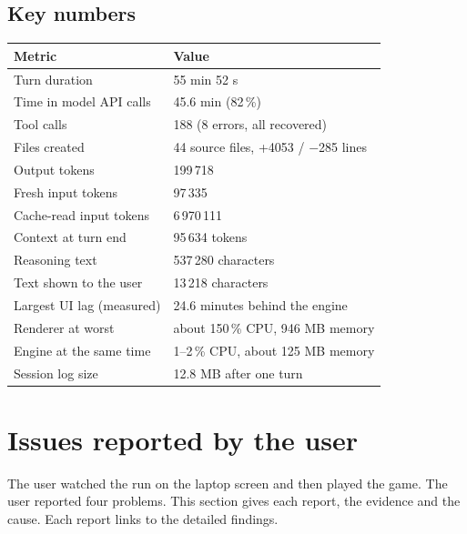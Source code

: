 \documentclass[11pt,a4paper]{article}
\begin{document}
\subsection{Key numbers}
\begin{center}
\begin{tabular}{@{}ll@{}}
\toprule
Metric & Value \\
\midrule
Turn duration & 55 min 52 s \\
Time in model API calls & 45.6 min (82\,\%) \\
Tool calls & 188 (8 errors, all recovered) \\
Files created & 44 source files, +4053 / $-$285 lines \\
Output tokens & 199\,718 \\
Fresh input tokens & 97\,335 \\
Cache-read input tokens & 6\,970\,111 \\
Context at turn end & 95\,634 tokens \\
Reasoning text & 537\,280 characters \\
Text shown to the user & 13\,218 characters \\
Largest UI lag (measured) & 24.6 minutes behind the engine \\
Renderer at worst & about 150\,\% CPU, 946 MB memory \\
Engine at the same time & 1--2\,\% CPU, about 125 MB memory \\
Session log size & 12.8 MB after one turn \\
\bottomrule
\end{tabular}
\end{center}

\section{Issues reported by the user}

The user watched the run on the laptop screen and then played the game. The
user reported four problems. This section gives each report, the evidence and
the cause. Each report links to the detailed findings.
\end{document}
